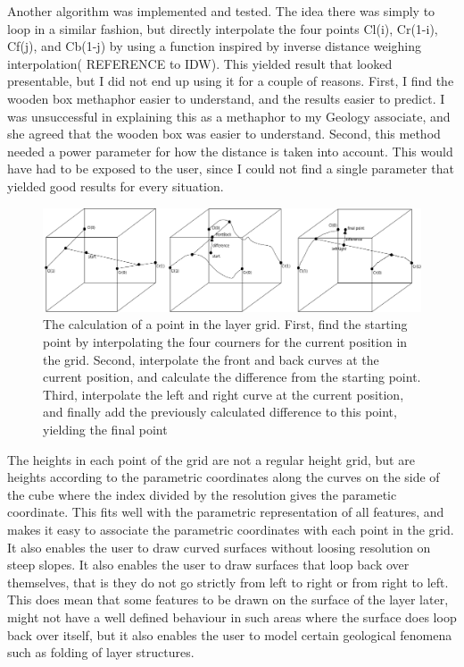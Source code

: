 \documentclass[a4paper,12pt]{article}
\begin{document}
Another algorithm was implemented and tested. The idea there was simply to loop in a similar fashion, but directly interpolate the four points Cl(i), Cr(1-i), Cf(j), and Cb(1-j) by using a function inspired by inverse distance weighing interpolation( REFERENCE to IDW). This yielded result that looked presentable, but I did not end up using it for a couple of reasons. First, I find the wooden box methaphor easier to understand, and the results easier to predict. I was unsuccessful in explaining this as a methaphor to my Geology associate, and she agreed that the wooden box was easier to understand. Second, this method needed a power parameter for how the distance is taken into account. This would have had to be exposed to the user, since I could not find a single parameter that yielded good results for every situation.

\begin{figure}
 \label{fig:layerCreation}
 \includegraphics[width=\linewidth]{thesis/layerCreation.pdf}
 \caption{The calculation of a point in the layer grid. First, find the starting point by interpolating the four courners for the current position in the grid. Second, interpolate the front and back curves at the current position, and calculate the difference from the starting point. Third, interpolate the left and right curve at the current position, and finally add the previously calculated difference to this point, yielding the final point}
\end{figure}



The heights in each point of the grid are not a regular height grid, but are heights according to the parametric coordinates along the curves on the side of the cube where the index divided by the resolution gives the parametic coordinate. This fits well with the parametric representation of all features, and makes it easy to associate the parametric coordinates with each point in the grid. It also enables the user to draw curved surfaces without loosing resolution on steep slopes. It also enables the user to draw surfaces that loop back over themselves, that is they do not go strictly from left to right or from right to left. This does mean that some features to be drawn on the surface of the layer later, might not have a well defined behaviour in such areas where the surface does loop back over itself, but it also enables the user to model certain geological fenomena such as folding of layer structures.
\end{document}
